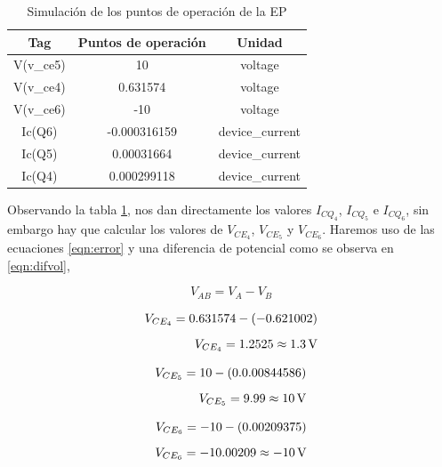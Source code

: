 \begin{enumerate}
        \begin{table}[H]
          \centering
          \begin{tabular}{|c|c|c|}
            \hline
            \textbf{Tag} & \textbf{Puntos de operación} & \textbf{Unidad} \\
            \hline
            V(v\_ce5)    & 10                           & voltage         \\ \hline
            V(v\_ce4)    & 0.631574                     & voltage         \\ \hline
            V(v\_ce6)    & -10                          & voltage         \\\hline
            Ic(Q6)       & -0.000316159                 & device\_current \\\hline
            Ic(Q5)       & 0.00031664                   & device\_current \\\hline

            Ic(Q4)       & 0.000299118                  & device\_current \\\hline
          \end{tabular}
          \caption{Simulación de los puntos de operación de la EP}
          \label{tab:pto_ope_ep}
        \end{table}

        Observando la tabla \ref{tab:pto_ope_ep}, nos dan directamente los valores $I_{CQ_4}$, $I_{CQ_5}$ e $I_{CQ_6}$, sin embargo hay que calcular los valores de $V_{CE_4}$, $V_{CE_5}$ y $V_{CE_6}$.
        Haremos uso de las ecuaciones \ref{eqn:error} y  una diferencia de potencial como se observa en \ref{eqn:difvol},

        \begin{equation}
          V_{AB}=V_A-V_B
          \label{eqn:difvol}
        \end{equation}

        \begin{align*}
          V_{CE_4}=0.631574 - (-0.621002) \\[0.2cm]
          V_{CE_4}=1.2525 \approx 1.3 \, \volt
        \end{align*}

        \begin{align*}
          V_{CE_5}=10 - (0.0.00844586) \\[0.2cm]
          V_{CE_5}=9.99 \approx 10 \, \volt
        \end{align*}

        \begin{align*}
          V_{CE_6}=-10 - (0.00209375) \\[0.2cm]
          V_{CE_6}=-10.00209 \approx -10 \, \volt
        \end{align*}


\end{enumerate}
